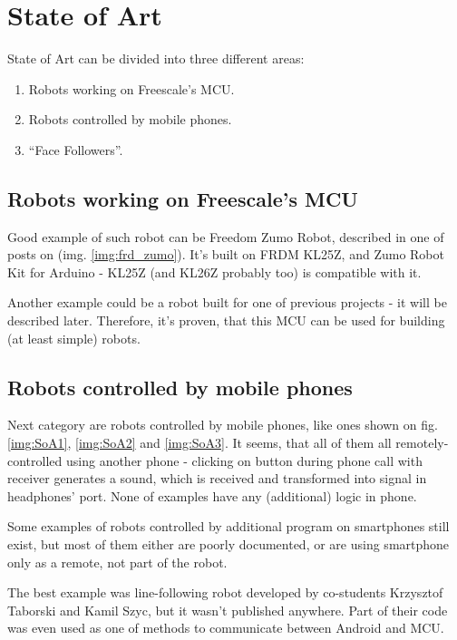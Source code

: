 \documentclass[openany]{mgr} %
\begin{document}
\section{State of Art}
State of Art can be divided into three different areas:
\begin{enumerate}
  \item Robots working on Freescale's MCU.
  \item Robots controlled by mobile phones.
  \item ``Face Followers''.
\end{enumerate}

\subsection{Robots working on Freescale's MCU}
Good example of such robot can be Freedom Zumo Robot, described in one of posts
on \cite{mcu_on_eclipse} (img. \ref{img:frd_zumo}). It's built on FRDM KL25Z,
and Zumo Robot Kit for Arduino - KL25Z (and KL26Z probably too) is compatible with
it.

Another example could be a robot built for one of previous projects - it will be
described later. Therefore, it's proven, that this MCU can be used for building
(at least simple) robots.

\subsection{Robots controlled by mobile phones}
Next category are robots controlled by mobile phones, like ones shown on fig.
\ref{img:SoA1}, \ref{img:SoA2} and \ref{img:SoA3}. It seems, that all of them
all remotely-controlled using another phone - clicking on button during phone
call with receiver generates a sound, which is received and transformed into
signal in headphones' port. None of examples have any (additional) logic in
phone. 

Some examples of robots controlled by additional program on smartphones
still exist, but most of them either are poorly documented, or are using
smartphone only as a remote, not part of the robot. 

The best example was line-following robot developed by co-students Krzysztof
Taborski and Kamil Szyc, but it wasn't published anywhere. Part of their code
was even used as one of methods to communicate between Android and MCU.

\end{document}
